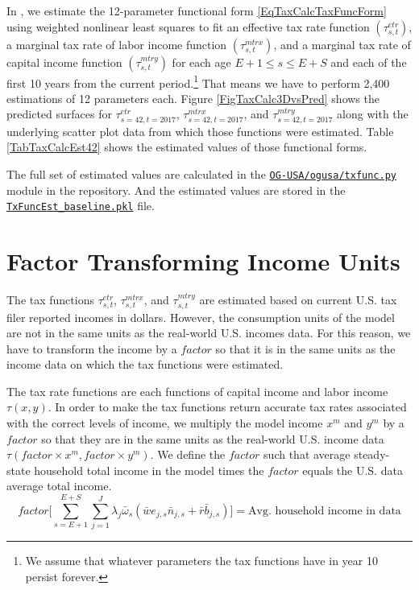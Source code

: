   In \ogindia, we estimate the 12-parameter functional form \eqref{EqTaxCalcTaxFuncForm} using weighted nonlinear least squares to fit an effective tax rate function $(\tau^{etr}_{s,t})$, a marginal tax rate of labor income function $(\tau^{mtrx}_{s,t})$, and a marginal tax rate of capital income function $(\tau^{mtry}_{s,t})$ for each age $E+1\leq s\leq E+S$ and each of the first 10 years from the current period.\footnote{We assume that whatever parameters the tax functions have in year 10 persist forever.} That means we have to perform 2,400 estimations of 12 parameters each. Figure \ref{FigTaxCalc3DvsPred} shows the predicted surfaces for $\tau^{etr}_{s=42,t=2017}$, $\tau^{mtrx}_{s=42,t=2017}$, and $\tau^{mtry}_{s=42,t=2017}$ along with the underlying scatter plot data from which those functions were estimated. Table \ref{TabTaxCalcEst42} shows the estimated values of those functional forms.

  The full set of estimated values are calculated in the \href{https://github.com/open-source-economics/OG-USA/blob/master/ogusa/txfunc.py}{\texttt{OG-USA/ogusa/txfunc.py}} module in the \ogindia repository. And the estimated values are stored in the \href{https://github.com/open-source-economics/OG-USA/blob/master/TxFuncEst_baseline.pkl}{\texttt{TxFuncEst\_baseline.pkl}} file.


\section{Factor Transforming Income Units}\label{SecTaxCalcFactor}

  The tax functions $\tau^{etr}_{s,t}$, $\tau^{mtrx}_{s,t}$, and $\tau^{mtry}_{s,t}$ are estimated based on current U.S. tax filer reported incomes in dollars. However, the consumption units of the \ogindia model are not in the same units as the real-world U.S. incomes data. For this reason, we have to transform the income by a $factor$ so that it is in the same units as the income data on which the tax functions were estimated.

  The tax rate functions are each functions of capital income and labor income $\tau(x,y)$. In order to make the tax functions return accurate tax rates associated with the correct levels of income, we multiply the model income $x^m$ and $y^m$ by a $factor$ so that they are in the same units as the real-world U.S. income data $\tau(factor\times x^m, factor\times y^m)$. We define the $factor$ such that average steady-state household total income in the model times the $factor$ equals the U.S. data average total income.
  \begin{equation}\label{EqTaxCalcFactor}
    factor\Biggl[\sum_{s=E+1}^{E+S}\sum_{j=1}^J\lambda_j\bar{\omega}_s\left(\bar{w}e_{j,s}\bar{n}_{j,s} + \bar{r}\bar{b}_{j,s}\right)\Biggr] = \text{Avg. household income in data}
  \end{equation}

